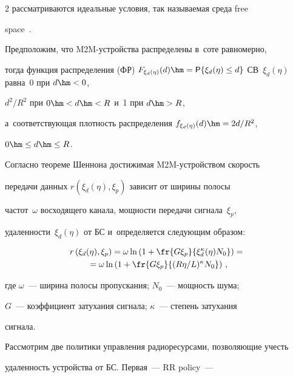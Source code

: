 \begin{multicols}{2}
рассматриваются идеальные условия, так называемая среда free  


space~\cite{9-gud}. 


  


  Предположим, что M2M-устрой\-ст\-ва распределены в~соте равномерно, 


тогда функция распределения (ФР) ${F}_{\xi_d(\eta)}(d)\hm= 


{\sf P}\{\xi_d(\eta)\leq d\}$ СВ~$\xi_d(\eta)$ равна~0 при $d\hm<0$, 


$d^2/R^2$ при $0\hm < d\hm < R$ и~1 при $d\hm > R$, 


а~соответствующая плотность распределения $f_{\xi_d(\eta)}(d)\hm= 2d/R^2$, 


$0\hm\leq d\hm\leq R$.


  


  Согласно теореме Шеннона достижимая M2M-устрой\-ст\-вом скорость 


передачи данных $r(\xi_d(\eta),\xi_p)$ зависит от ширины полосы 


частот~$\omega$ восходящего канала, мощности передачи сигнала~$\xi_p$, 


уда\-лен\-ности~$\xi_d(\eta)$ от БС и~определяется следующим образом:


  \begin{multline*}


  r\left( \xi_d(\eta),\xi_p\right) = 


  \omega\ln \left( 1+\fr{G\xi_p}{\xi_d^\kappa(\eta) 


N_0}\right) ={}\\


{}=\omega \ln \left( 1+ \fr{G\xi_p}{(R\eta/L)^\kappa N_0}\right)\,,




  \end{multline*}


где $\omega$~--- ширина полосы пропускания; $N_0$~--- мощность шума; 


$G$~--- коэффициент затухания сигнала; $\kappa$~--- степень затухания 


сигнала.    





  Рассмотрим две политики управления радиоресурсами, позволяющие учесть 


удаленность устройства от БС. Первая~--- RR policy~--- 



\end{multicols}
